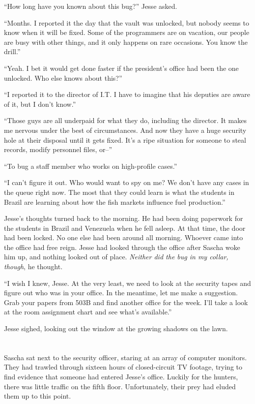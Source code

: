 \documentclass[12pt]{book}
\begin{document}
``How long have you known about this bug?'' Jesse asked.

``Months.  I reported it the day that the vault was unlocked, but nobody seems to know when it will be fixed.  Some of the programmers are on vacation, our people are busy with other things, and it only happens on rare occasions.  You know the drill.''

``Yeah.  I bet it would get done faster if the president's office had been the one unlocked.  Who else knows about this?''

``I reported it to the director of I.T.  I have to imagine that his deputies are aware of it, but I don't know.''

``Those guys are all underpaid for what they do, including the director.  It makes me nervous under the best of circumstances.  And now they have a huge security hole at their disposal until it gets fixed.  It's a ripe situation for someone to steal records, modify personnel files, or--''

``To bug a staff member who works on high-profile cases.''

``I can't figure it out.  Who would want to spy on me?  We don't have any cases in the queue right now.  The most that they could learn is what the students in Brazil are learning about how the fish markets influence fuel production.''

Jesse's thoughts turned back to the morning.  He had been doing paperwork for the students in Brazil and Venezuela when he fell asleep.  At that time, the door had been locked.  No one else had been around all morning.  Whoever came into the office had free reign.  Jesse had looked through the office after Sascha woke him up, and nothing looked out of place.  \emph{Neither did the bug in my collar, though}, he thought.

``I wish I knew, Jesse.  At the very least, we need to look at the security tapes and figure out who was in your office.  In the meantime, let me make a suggestion.  Grab your papers from 503B and find another office for the week.  I'll take a look at the room assignment chart and see what's available.''

Jesse sighed, looking out the window at the growing shadows on the lawn.

\chapter{}
				
Sascha sat next to the security officer, staring at an array of computer monitors.  They had trawled through sixteen hours of closed-circuit TV footage, trying to find evidence that someone had entered Jesse's office.  Luckily for the hunters, there was little traffic on the fifth floor.  Unfortunately, their prey had eluded them up to this point.
\end{document}
